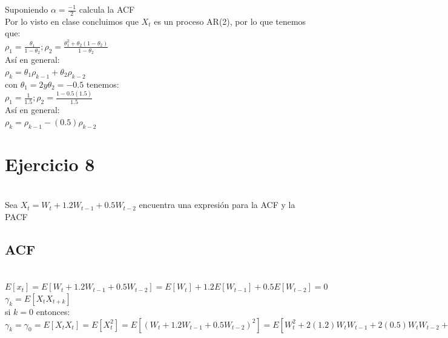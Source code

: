 \documentclass{article}
\begin{document}
Suponiendo $\alpha = \frac{-1}{2}$ calcula la ACF\\

Por lo visto en clase concluimos que $X_t $ es un proceso AR(2), por lo que tenemos que:\\

$\rho_1 = \frac{\theta_1}{1-\theta_2}    ;   \rho_2 = \frac{\theta_1 ^2 + \theta_2(1-\theta_2)}{1-\theta_2}$\\

Así en general:\\

$\rho_k = \theta_1 \rho_{k-1} + \theta_2 \rho_{k-2} $\\

con $\theta_1 = 2  y \theta_2= -0.5 $ tenemos: \\

$\rho_1 = \frac{1}{1.5}    ;   \rho_2 = \frac{1 -0.5(1.5)}{1.5}$\\

Así en general:\\

$\rho_k = \rho_{k-1} -(0.5) \rho_{k-2} $\\


\section{Ejercicio 8}\\

Sea $X_t = W_t + 1.2 W_{t-1} + 0.5 W_{t-2}$  encuentra una expresi{ó}n para la ACF y la PACF

\subsection{ACF}\\

$E[x_t] = E[W_t + 1.2 W_{t-1} + 0.5 W_{t-2}] = E[W_t] + 1.2 E[W_{t-1}] + 0.5 E[W_{t-2}] = 0$\\

$\gamma_k = E[X_t X_{t+k}]$\\

si $k=0$ entonces: \\

$\gamma_k = \gamma_0 = E[X_t X_t] = E[X_t^2]=E[(W_t + 1.2 W_{t-1} + 0.5 W_{t-2})^2] = E[W_t ^2 +2(1.2)W_t W_{t-1} + 2(0.5) W_t W_{t-2} + 2(1.5)(0.5)W_{t-1} W_{t-2} +(1.2)^2 W_{t-1}^2+ (0.5)^2 W_{t-2}^2] =  E[W_t ^2] + E[2(1.2)W_t W_{t-1} ]+E[ 2(0.5) W_t W_{t-2}] + E[2(1.5)(0.5)W_{t-1} W_{t-2}] +E[(1.2)^2 W_{t-1}^2]+E[ (0.5)^2 W_{t-2}^2] =E[W_t ^2] + E[(1.2)^2 W_{t-1}^2]+E[ (0.5)^2 W_{t-2}^2] = E[W_t ^2] +(1.2)^2 E[ W_{t-1}^2]+(0.5)^2 E[W_{t-2}^2] = 1+(1.2)^2 +(0.5)^2  $\\
\end{document}
